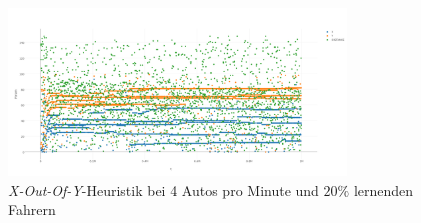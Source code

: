 \begin{figure}[H]
	\includegraphics[width=0.8\textwidth]{analyse/SomeMutants/4pm/xy.png}
	\caption{\emph{X-Out-Of-Y}-Heuristik bei 4 Autos pro Minute und $20\%$ lernenden Fahrern}\label{fig:ap_pm_xy_4}
\end{figure}

